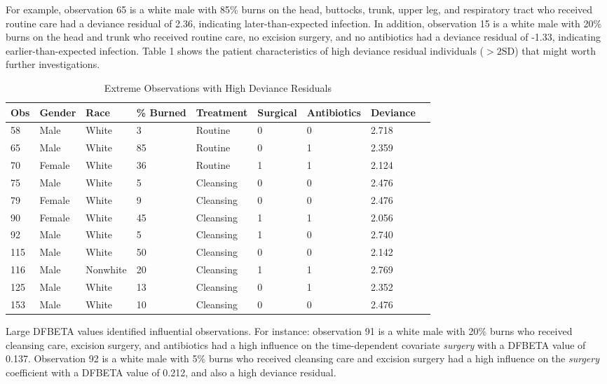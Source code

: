 \documentclass[12pt]{article}
\begin{document}
For example, observation 65 is a white male with 85\% burns on the head, buttocks, trunk, upper leg, and respiratory tract who received routine care had a deviance residual of 2.36, indicating later-than-expected infection. In addition, observation 15 is a white male with 20\% burns on the head and trunk who received routine care, no excision surgery, and no antibiotics had a deviance residual of -1.33, indicating earlier-than-expected infection. Table 1 shows the patient characteristics of high deviance residual individuals (\( > 2\text{SD} \)) that might worth further investigations.

\begin{table}[H]
\centering
\caption{Extreme Observations with High Deviance Residuals}
\label{tab:extreme_deviance}
\begin{tabular}{lllllllll}
\toprule
Obs & Gender & Race      & \% Burned & Treatment   & Surgical & Antibiotics & Deviance \\
\midrule
58  & Male   & White     & 3         & Routine     & 0        & 0           & 2.718    \\
65  & Male   & White     & 85        & Routine     & 0        & 1           & 2.359    \\
70  & Female & White     & 36        & Routine     & 1        & 1           & 2.124    \\
75  & Male   & White     & 5         & Cleansing   & 0        & 0           & 2.476    \\
79  & Female & White     & 9         & Cleansing   & 0        & 0           & 2.476    \\
90  & Female & White     & 45        & Cleansing   & 1        & 1           & 2.056    \\
92  & Male   & White     & 5         & Cleansing   & 1        & 0           & 2.740    \\
115 & Male   & White     & 50        & Cleansing   & 0        & 0           & 2.142    \\
116 & Male   & Nonwhite  & 20        & Cleansing   & 1        & 1           & 2.769    \\
125 & Male   & White     & 13        & Cleansing   & 0        & 1           & 2.352    \\
153 & Male   & White     & 10        & Cleansing   & 0        & 0           & 2.476    \\
\bottomrule
\end{tabular}
\end{table}


Large DFBETA values identified influential observations. For instance: observation 91 is a white male with 20\% burns who received cleansing care, excision surgery, and antibiotics had a high influence on the time-dependent covariate \textit{surgery} with a DFBETA value of 0.137. Observation 92 is a white male with 5\% burns who received cleansing care and excision surgery had a high influence on the \textit{surgery} coefficient with a DFBETA value of 0.212, and also a high deviance residual.
\end{document}
